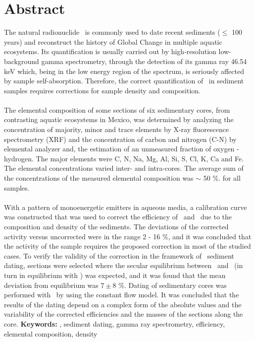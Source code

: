 \cleardoublepage
{}
{}
\chapter*{Abstract}
\lettrine{T}{}he natural radionuclide \PbCero\, is commonly used to date recent sediments ($\leq$ 100 years) and reconstruct the history of Global Change in multiple aquatic ecosystems. Its quantification is usually carried out  by high-resolution low-background gamma spectrometry, through the detection of its gamma ray 46.54 keV which, being in the low energy region of the spectrum, is seriously affected by sample self-absorption. Therefore, the correct quantification of \PbCero\, in sediment samples requires corrections for sample density and composition.
\\
\\
The elemental composition of some sections of six sedimentary cores, from contrasting aquatic ecosystems in Mexico, was determined by analyzing the concentration of majority, minor and trace elements by X-ray fluorescence spectrometry (XRF) and the concentration of carbon and nitrogen (C-N) by elemental analyzer and, the estimation of an unmeasured fraction of oxygen - hydrogen. The major elements were C, N, Na, Mg, Al, Si, S, Cl, K, Ca and Fe. The elemental concentrations varied inter- and intra-cores. The average sum of the concentrations of the measured elemental composition was $\sim$ 50 \%. for all samples.
\\
\\
With a pattern of monoenergetic emitters in aqueous media, a calibration curve was constructed that was used to correct the efficiency of \PbCero\, and \PbCuatro\, due to the composition and density of the sediments. The deviations of the corrected activity versus uncorrected were in the range 2 - 16 \%, and it was concluded that the activity of the sample requires the proposed correction in most of the studied cases. To verify the validity of the correction in the framework of \PbCero\, sediment dating, sections were selected where the secular equilibrium between \PbCero\, and \PbCuatro\, (in turn in equilibrium with \Ra) was expected, and it was found that the mean deviation from equilibrium was $7 \pm 8$ \%. Dating of sedimentary cores was performed  with \PbCero\, by using the constant flow model. It was concluded that the results of the dating depend on a complex form of the absolute values and the variability of the corrected efficiencies and the masses of the sections along the core. 
\newpage
\textbf{Keywords:} \PbCero, sediment dating, gamma ray spectrometry, efficiency, elemental composition, density